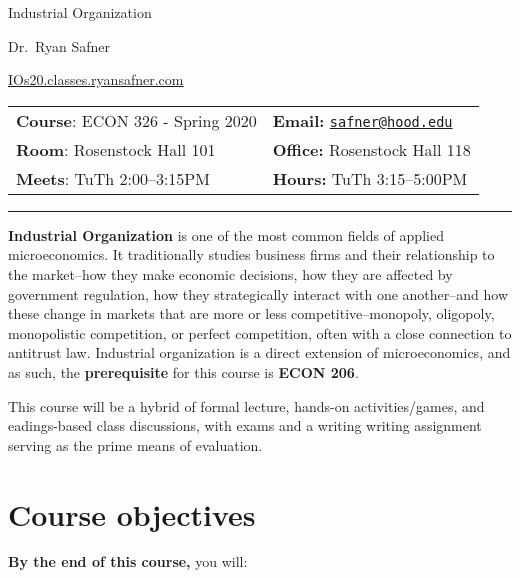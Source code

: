 \documentclass{article}
\begin{document}
\sffamily

\centerline{\Huge Industrial Organization}

\vspace{3 mm}

\centerline{\large Dr.~Ryan Safner}
\vspace{2 mm}
\centerline{\large \href{http://IOS20.classes.ryansafner.com}{IOs20.classes.ryansafner.com}}

\vspace{5 mm}

\begin{tabular}{@{}p{3.5in}p{3.5in}}           
\textbf{Course}: ECON 326 - Spring 2020  & \textbf{Email:}  \href{mailto:safner@hood.edu}{\nolinkurl{safner@hood.edu}}\\
\textbf{Room}: Rosenstock Hall 101 & \textbf{Office:}  Rosenstock Hall 118\\
\textbf{Meets}: TuTh 2:00--3:15PM & \textbf{Hours:} TuTh 3:15--5:00PM\\ 
\end{tabular}

\vspace{5 mm}

\hrule


\textbf{Industrial Organization} is one of the most common fields of
applied microeconomics. It traditionally studies business firms and
their relationship to the market--how they make economic decisions, how
they are affected by government regulation, how they strategically
interact with one another--and how these change in markets that are more
or less competitive--monopoly, oligopoly, monopolistic competition, or
perfect competition, often with a close connection to antitrust law.
Industrial organization is a direct extension of microeconomics, and as
such, the \textbf{prerequisite} for this course is \textbf{ECON 206}.

This course will be a hybrid of formal lecture, hands-on
activities/games, and eadings-based class discussions, with exams and a
writing writing assignment serving as the prime means of evaluation.

\hypertarget{course-objectives}{%
\section{Course objectives}\label{course-objectives}}

\textbf{By the end of this course,} you will:
\end{document}

